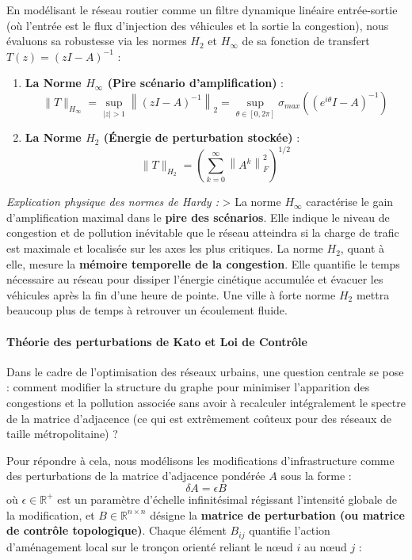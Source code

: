 \documentclass[10pt, a4paper]{article}
\providecommand{\tightlist}{}
\begin{document}
En modélisant le réseau routier comme un filtre dynamique linéaire
entrée-sortie (où l'entrée est le flux d'injection des véhicules et la
sortie la congestion), nous évaluons sa robustesse via les normes
\(H_2\) et \(H_\infty\) de sa fonction de transfert
\(T(z) = (zI - A)^{-1}\) :

\begin{enumerate}
\def\labelenumi{\arabic{enumi}.}
\tightlist
\item
  \textbf{La Norme \(H_\infty\) (Pire scénario d'amplification)} :
  \[\|T\|_{H_\infty} = \sup_{|z| > 1} \left\| (zI - A)^{-1} \right\|_2 = \sup_{\theta \in [0, 2\pi]} \sigma_{max}\left( (e^{i\theta}I - A)^{-1} \right)\]
\item
  \textbf{La Norme \(H_2\) (Énergie de perturbation stockée)} :
  \[\|T\|_{H_2} = \left( \sum_{k=0}^{\infty} \left\| A^k \right\|_F^2 \right)^{1/2}\]
\end{enumerate}

\emph{Explication physique des normes de Hardy :} \textgreater{} La
norme \(H_\infty\) caractérise le gain d'amplification maximal dans le
\textbf{pire des scénarios}. Elle indique le niveau de congestion et de
pollution inévitable que le réseau atteindra si la charge de trafic est
maximale et localisée sur les axes les plus critiques. La norme \(H_2\),
quant à elle, mesure la \textbf{mémoire temporelle de la congestion}.
Elle quantifie le temps nécessaire au réseau pour dissiper l'énergie
cinétique accumulée et évacuer les véhicules après la fin d'une heure de
pointe. Une ville à forte norme \(H_2\) mettra beaucoup plus de temps à
retrouver un écoulement fluide.

\paragraph{Théorie des perturbations de Kato et Loi de
Contrôle}\label{thuxe9orie-des-perturbations-de-kato-et-loi-de-contruxf4le}

Dans le cadre de l'optimisation des réseaux urbains, une question
centrale se pose : comment modifier la structure du graphe pour
minimiser l'apparition des congestions et la pollution associée sans
avoir à recalculer intégralement le spectre de la matrice d'adjacence
(ce qui est extrêmement coûteux pour des réseaux de taille
métropolitaine) ?

Pour répondre à cela, nous modélisons les modifications d'infrastructure
comme des perturbations de la matrice d'adjacence pondérée \(A\) sous la
forme : \[\delta A = \epsilon B\] où \(\epsilon \in \mathbb{R}^+\) est
un paramètre d'échelle infinitésimal régissant l'intensité globale de la
modification, et \(B \in \mathbb{R}^{n \times n}\) désigne la
\textbf{matrice de perturbation (ou matrice de contrôle topologique)}.
Chaque élément \(B_{ij}\) quantifie l'action d'aménagement local sur le
tronçon orienté reliant le nœud \(i\) au nœud \(j\) :
\end{document}
